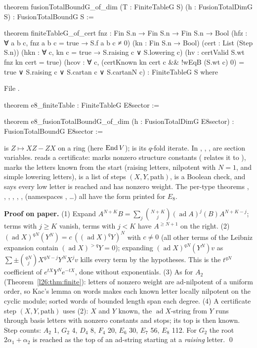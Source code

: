 \begin{leancode}
theorem fusionTotalBoundG_of_dim (T : FiniteTableG S) (h : FusionTotalDimG S) :
    FusionTotalBoundG S :=

theorem finiteTableG_of_cert {fnz : Fin S.n → Fin S.n → Fin S.n → Bool}
    (hfz : ∀ a b c, fnz a b c = true → S.f a b c ≠ 0) (kn : Fin S.n → Bool) (cert : List (Step S.n))
    (hkn : ∀ c, kn c = true → S.raising c ∨ S.lowering c) (hv : certValid S.wt fnz kn cert = true)
    (hcov : ∀ c, (certKnown kn cert c && !wEqB (S.wt c) 0) = true ∨
      S.raising c ∨ S.cartan c ∨ S.cartanN c) :
    FiniteTableG S where
\end{leancode}
\noindent File .
\begin{leancode}
theorem e8_finiteTable : FiniteTableG E8sector :=

theorem e8_fusionTotalBoundG_of_dim (h : FusionTotalDimG E8sector) :
    FusionTotalBoundG E8sector :=
\end{leancode}

\begin{dictionary}
 is $Z\mapsto XZ-ZX$ on a ring (here $\operatorname{End} V$);  is its $q$-fold iterate. In
, , ,  are section variables.  reads a
certificate:  marks nonzero structure constants ( relates it to ),  marks the letters known
from the start (raising letters, nilpotent with $N=1$, and simple lowering letters),  is a list of steps
$(X,Y,\text{path})$,  is a Boolean check, and  says every low letter is reached and has nonzero weight.
The per-type theorems , , , , , , 
(namespaces , \dots) all have the form printed for $E_8$.
\end{dictionary}

\textbf{Proof on paper.} (1) Expand $A^{N+K}B=\sum_j\binom{N+K}j(\operatorname{ad}A)^j(B)A^{N+K-j}$; terms with $j\ge K$ vanish,
terms with $j<K$ have $A^{\ge N+1}$ on the right. (2) $(\operatorname{ad}X)^{qN}(Y^N)=c\,((\operatorname{ad}X)^qY)^N$ with $c\neq0$ (all
other terms of the Leibniz expansion contain $(\operatorname{ad}X)^{>q}Y=0$); expanding $(\operatorname{ad}X)^{qN}(Y^N)v$ as
$\sum\pm\binom{qN}jX^{qN-j}Y^NX^jv$ kills every term by the hypotheses. This is the $t^{qN}$ coefficient of
$e^{tX}Y^Ne^{-tX}$, done without exponentials. (3) As for $A_2$ (Theorem~\ref{l26:thm:finite}): letters of nonzero weight are
ad-nilpotent of a uniform order, so Kac's lemma on words makes each known letter locally nilpotent on the cyclic module; sorted words
of bounded length span each degree. (4) A certificate step $(X,Y,\text{path})$ uses (2): $X$ and $Y$ known, the $\operatorname{ad}X$-string
from $Y$ runs through basis letters with nonzero constants and stops; its top is then known. Step counts: $A_2$ 1, $G_2$ 4, $D_4$ 8,
$F_4$ 20, $E_6$ 30, $E_7$ 56, $E_8$ 112. For $G_2$ the root $2\alpha_1+\alpha_2$ is reached as the top of an ad-string starting at a
\emph{raising} letter. \qed

